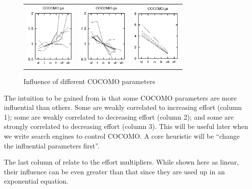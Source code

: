 \begin{figure}
\begin{center}
\begin{tabular}{c|c|c}
\includegraphics[width=2.5cm]{cocgadown.eps}&
\includegraphics[width=2.5cm]{cocgaup.eps}&
\includegraphics[width=2.5cm]{cocgacliff.eps}
\end{tabular}
\end{center}
\caption{Influence of different COCOMO parameters}\label{fig:tunings}
\end{figure}



The intuition to be gained from  is that some COCOMO
parameters are more influential than others. Some are weakly
correlated to increasing effort (column 1); some are weakly
correlated to decreasing effort (column 2); and some are strongly
correlated to decreasing effort (column 3). This will be useful later
when we write search engines to control COCOMO. A core heuristic will
be ``change the influential parameters first''.

The last column of  relate to the effort multipliers.
While shown here as linear, their influence can be even greater than
that since they are used up in an exponential equation.
